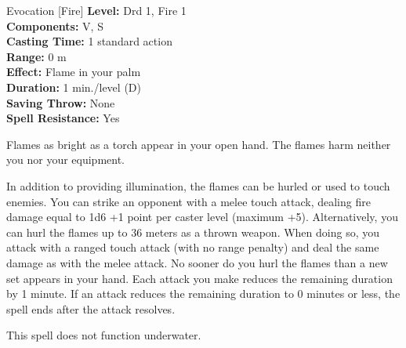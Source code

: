 {Evocation [Fire]}
{
	\textbf{Level:}
	Drd 1, Fire 1\\
	\textbf{Components:}
	V, S\\
	\textbf{Casting Time:}
	1 standard action\\
	\textbf{Range:}
	0 m\\
	\textbf{Effect:}
	Flame in your palm\\
	\textbf{Duration:}
	1 min./level (D)\\
	\textbf{Saving Throw:}
	None\\
	\textbf{Spell Resistance:}
	Yes\\
}
{
	Flames as bright as a torch appear in your open hand. The flames harm neither you nor your equipment.

	In addition to providing illumination, the flames can be hurled or used to touch enemies. You can strike an opponent with a melee touch attack, dealing fire damage equal to 1d6 +1 point per caster level (maximum +5). Alternatively, you can hurl the flames up to 36 meters as a thrown weapon. When doing so, you attack with a ranged touch attack (with no range penalty) and deal the same damage as with the melee attack. No sooner do you hurl the flames than a new set appears in your hand. Each attack you make reduces the remaining duration by 1 minute. If an attack reduces the remaining duration to 0 minutes or less, the spell ends after the attack resolves.

	This spell does not function underwater.

}
